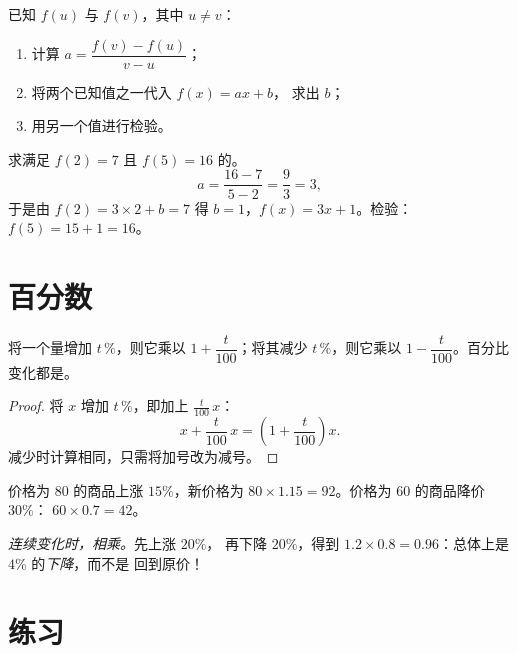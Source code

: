 \begin{method}[由两个函数值求一次函数]\label{met:g9:linfunc:findaffine}
已知 $f(u)$ 与 $f(v)$，其中 $u \neq v$：
\begin{enumerate}
  \item 计算 $a = \dfrac{f(v) - f(u)}{v - u}$；
  \item 将两个已知值之一代入 $f(x) = ax + b$，
        求出 $b$；
  \item 用另一个值进行检验。
\end{enumerate}
\end{method}

\begin{example}\label{ex:g9:linfunc:findaffine}
求满足 $f(2) = 7$ 且 $f(5) = 16$ 的。
\[
a = \frac{16 - 7}{5 - 2} = \frac93 = 3 ,
\]
于是由 $f(2) = 3 \times 2 + b = 7$ 得 $b = 1$，$f(x) = 3x + 1$。检验：
$f(5) = 15 + 1 = 16$。
\end{example}

\section{百分数}

\begin{proposition}[百分比变化]\label{prop:g9:linfunc:percent}
将一个量增加 $t\,\%$，则它乘以
$1 + \dfrac{t}{100}$；将其减少 $t\,\%$，则它乘以
$1 - \dfrac{t}{100}$。百分比变化都是。
\end{proposition}

\begin{proof}
将 $x$ 增加 $t\,\%$，即加上 $\frac{t}{100}\,x$：
\[
x + \frac{t}{100}\,x = \left(1 + \frac{t}{100}\right) x .
\]
减少时计算相同，只需将加号改为减号。
\end{proof}

\begin{example}\label{ex:g9:linfunc:percent}
价格为 $80$ 的商品上涨 $15\%$，新价格为
$80 \times 1.15 = 92$。价格为 $60$ 的商品降价 $30\%$：
$60 \times 0.7 = 42$。

\emph{连续变化时，相乘。}先上涨 $20\%$，
再下降 $20\%$，得到
$1.2 \times 0.8 = 0.96$：总体上是 $4\%$ 的\emph{下降}，而不是
回到原价！
\end{example}

\section{练习}

